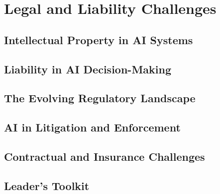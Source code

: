 \chapter{Legal and Liability Challenges}
\label{chap:legal_and_liability_challenges}

\section{Intellectual Property in AI Systems}
\label{sec:ip_in_ai}

\section{Liability in AI Decision-Making}
\label{sec:liability_in_ai}

\section{The Evolving Regulatory Landscape}
\label{sec:regulatory_landscape}

\section{AI in Litigation and Enforcement}
\label{sec:ai_in_litigation}

\section{Contractual and Insurance Challenges}
\label{sec:contractual_challenges}

\section{Leader's Toolkit}
\label{sec:legal_leaders_toolkit}